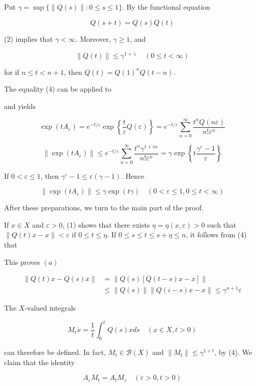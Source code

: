 \documentclass[10pt]{article}
\begin{document}
Put $\gamma=\sup \{\|Q(s)\|: 0 \leq s \leq 1\}$. By the functional equation

$$
Q(s+t)=Q(s) Q(t)
$$

(2) implies that $\gamma<\infty$. Moreover, $\gamma \geq 1$, and

$$
\|Q(t)\| \leq \gamma^{1+\hat{\imath}} \quad(0 \leq t<\infty)
$$

for if $n \leq t<n+1$, then $Q(t)=Q(1)^{n} Q(t-n)$.

The equality (4) can be applied to

and yields

$$
\exp \left(t A_{\varepsilon}\right)=e^{-t / \varepsilon} \exp \left\{\frac{t}{\varepsilon} Q(\varepsilon)\right\}=e^{-t / \varepsilon} \sum_{n=0}^{\infty} \frac{t^{n} Q(n \varepsilon)}{n ! \varepsilon^{n}}
$$

$$
\left\|\exp \left(t A_{\varepsilon}\right)\right\| \leq e^{-t / \varepsilon} \sum_{n=0}^{\infty} \frac{t^{n} \gamma^{1+n \varepsilon}}{n ! \varepsilon^{n}}=\gamma \exp \left\{t \frac{\gamma^{\varepsilon}-1}{\varepsilon}\right\}
$$

If $0<\varepsilon \leq 1$, then $\gamma^{\varepsilon}-1 \leq \varepsilon(\gamma-1)$. Hence

$$
\left\|\operatorname{cxp}\left(t A_{\varepsilon}\right)\right\| \leq \gamma \exp (t \gamma) \quad(0<\varepsilon \leq 1,0 \leq t<\infty)
$$

After these preparations, we turn to the main part of the proof.

If $x \in X$ and $\varepsilon>0$, (1) shows that there exists $\eta=\eta(x, \varepsilon)>0$ such that $\|Q(t) x-x\|<\varepsilon$ if $0 \leq t \leq \eta$. If $0 \leq s \leq t \leq s+\eta \leq n$, it follows from (4) that

This proves $(a)$

$$
\begin{aligned}
\|Q(t) x-Q(s) x\| & =\|Q(s)[Q(t-s) x-x]\| \\
& \leq\|Q(s)\|\|Q(i-s) x-x\| \leq \gamma^{n+1} \varepsilon
\end{aligned}
$$

The $X$-valued integrals

$$
M_{t} \dot{x}=\frac{1}{t} \int_{0}^{t} Q(s) x d s \quad(x \in X, t>0)
$$

can therefore be defined. In fact, $M_{t} \in \mathscr{B}(X)$ and $\left\|M_{t}\right\| \leq \gamma^{1+t}$, by (4). We claim that the identity

$$
A_{\varepsilon} M_{t}=A_{t} M_{\varepsilon} \quad(\varepsilon>0, t>0)
$$
\end{document}
